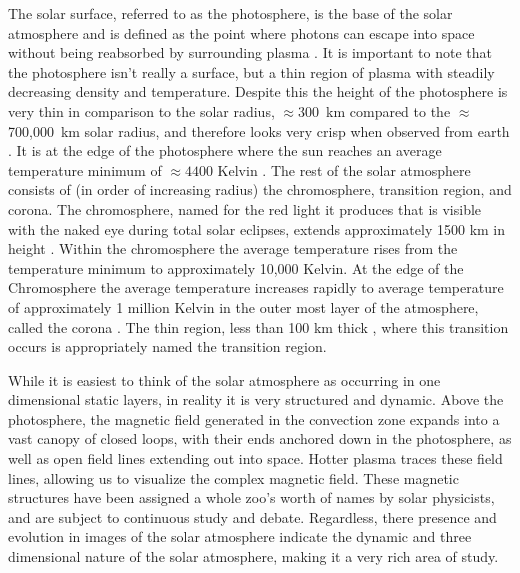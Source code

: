The solar surface, referred to as the photosphere, is the base of the solar atmosphere and is defined as the point where photons can escape into space without being reabsorbed by surrounding plasma \citep{Priest2014}.
It is important to note that the photosphere isn't really a surface, but a thin region of plasma with steadily decreasing density and temperature.
Despite this the height of the photosphere is very thin in comparison to the solar radius, $\approx 300$\, km compared to the $\approx$ 700,000\, km solar radius, and therefore looks very crisp when observed from earth \citep{JudgeBook}.
It is at the edge of the photosphere where the sun reaches an average temperature minimum of $\approx4400$ Kelvin \citep{SolarPhysicsOverview}.
The rest of the solar atmosphere consists of (in order of increasing radius) the chromosphere, transition region, and corona.
The chromosphere, named for the red light it produces that is visible with the naked eye during total solar eclipses, extends approximately 1500 km in height \citep{SolarPhysicsOverview}.
Within the chromosphere the average temperature rises from the temperature minimum to approximately 10,000  Kelvin.
At the edge of the Chromosphere the average temperature increases rapidly to average temperature of approximately 1 million Kelvin in the outer most layer of the atmosphere, called the corona \citep{SolarPhysicsOverview}.
The thin region, less than 100 km thick \citep{Priest2014}, where this transition occurs is appropriately named the transition region.

While it is easiest to think of the solar atmosphere as occurring in one dimensional static layers, in reality it is very structured and dynamic.
Above the photosphere, the magnetic field generated in the convection zone expands into a vast canopy of closed loops, with their ends anchored down in the photosphere, as well as open field lines extending out into space.
Hotter plasma traces these field lines, allowing us to visualize the complex magnetic field.
These magnetic structures have been assigned a whole zoo's worth of names by solar physicists, and are subject to continuous study and debate.
Regardless, there presence and evolution in images of the solar atmosphere indicate the dynamic and three dimensional nature of the solar atmosphere, making it a very rich area of study.


